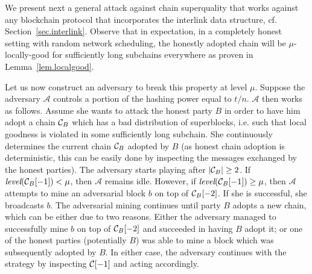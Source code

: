 We present next a general attack against chain superquality
that works against any blockchain protocol that incorporates
the interlink data structure, cf. Section~\ref{sec.interlink}.
Observe that in expectation, in a
completely honest setting with random network scheduling, the honestly adopted
chain will be $\mu$-locally-good for sufficiently long subchains everywhere as
proven in Lemma~\ref{lem.localgood}.

Let us now construct an adversary to break this property at level $\mu$. Suppose
the adversary $\mathcal{A}$ controls a portion of the hashing power equal to
$t/n$. $\mathcal{A}$ then works as follows. Assume she wants to attack the
honest party $B$ in order to have him adopt a chain $\mathcal{C}_B$ which has a bad
distribution of superblocks, i.e. such that local goodness is violated in some
sufficiently long subchain. She continuously determines the current chain
$\mathcal{C}_B$ adopted by $B$ (as honest chain adoption is deterministic, this can
be easily done by inspecting the messages exchanged by the honest parties). The
adversary starts playing after $|\mathcal{C}_B| \geq 2$. If
$\textit{level}(\mathcal{C}_B[-1]) < \mu$, then $\mathcal{A}$ remains idle. However,
if $\textit{level}(\mathcal{C}_B[-1]) \geq \mu$, then $\mathcal{A}$ attempts to mine
an adversarial block $b$ on top of $\mathcal{C}_B[-2]$. If she is successful, she
broadcasts $b$. The adversarial mining continues until party $B$ adopts a new
chain, which can be either due to two reasons. Either the adversary managed to
successfully mine $b$ on top of $\mathcal{C}_B[-2]$ and succeeded in having $B$ adopt
it; or one of the honest parties (potentially $B$) was able to mine a block
which was subsequently adopted by $B$. In either case, the adversary continues
with the strategy by inspecting $\mathcal{C}[-1]$ and acting accordingly.


